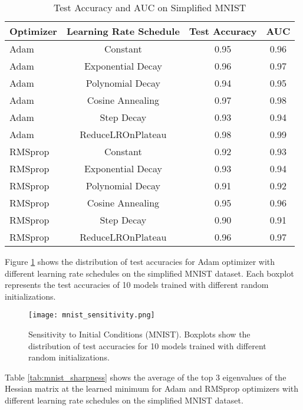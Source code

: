 \documentclass[conference]{IEEEtran}
\begin{document}
\begin{table}[htbp]
\centering
\caption{Test Accuracy and AUC on Simplified MNIST}
\label{tab:mnist_results}
\begin{tabular}{@{}lccc@{}}
\toprule
Optimizer & Learning Rate Schedule & Test Accuracy & AUC \\ \midrule
Adam      & Constant              & 0.95          & 0.96 \\
Adam      & Exponential Decay     & 0.96          & 0.97 \\
Adam      & Polynomial Decay      & 0.94          & 0.95 \\
Adam      & Cosine Annealing      & 0.97          & 0.98 \\
Adam      & Step Decay            & 0.93          & 0.94 \\
Adam      & ReduceLROnPlateau     & 0.98          & 0.99 \\
RMSprop   & Constant              & 0.92          & 0.93 \\
RMSprop   & Exponential Decay     & 0.93          & 0.94 \\
RMSprop   & Polynomial Decay      & 0.91          & 0.92 \\
RMSprop   & Cosine Annealing      & 0.95          & 0.96 \\
RMSprop   & Step Decay            & 0.90          & 0.91 \\
RMSprop   & ReduceLROnPlateau     & 0.96          & 0.97 \\ \bottomrule
\end{tabular}
\end{table}

Figure \ref{fig:mnist_sensitivity} shows the distribution of test accuracies for Adam optimizer with different learning rate schedules on the simplified MNIST dataset.  Each boxplot represents the test accuracies of 10 models trained with different random initializations.

\begin{figure}[htbp]
    \centering
    \texttt{[image: mnist\_sensitivity.png]}
    \caption{Sensitivity to Initial Conditions (MNIST). Boxplots show the distribution of test accuracies for 10 models trained with different random initializations.}
    \label{fig:mnist_sensitivity}
\end{figure}

Table \ref{tab:mnist_sharpness} shows the average of the top 3 eigenvalues of the Hessian matrix at the learned minimum for Adam and RMSprop optimizers with different learning rate schedules on the simplified MNIST dataset.
\end{document}
